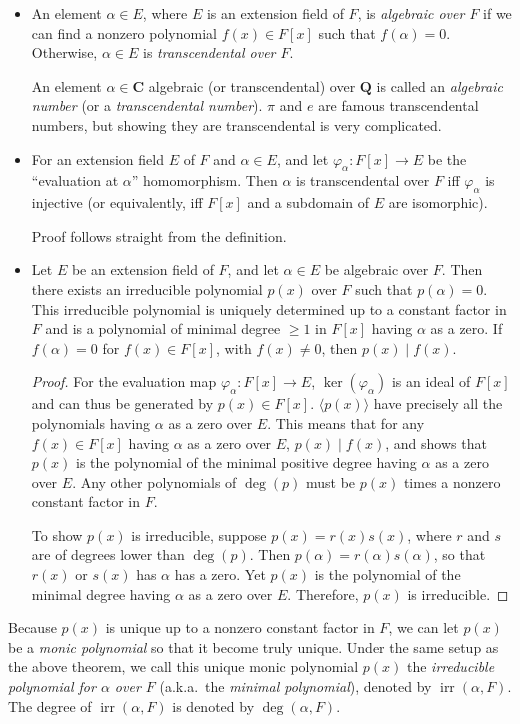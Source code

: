 \documentclass[11pt]{article}
\newcommand{\Q}{\mathbf{Q}}
\newcommand{\C}{\mathbf{C}}
\newcommand{\df}[1]{\textit{\textsf{#1}}}
\newcommand{\gen}[1]{\langle #1 \rangle}
\newcommand{\irr}{\operatorname{irr}}
\renewcommand{\phi}{\varphi}
\begin{document}
\begin{itemize}
    \item An element $\alpha \in E$, where $E$ is an extension field of $F$, is \df{algebraic over $F$} if we can find a nonzero polynomial $f(x) \in F[x]$ such that $f(\alpha) = 0$. Otherwise, $\alpha \in E$ is \df{transcendental over $F$}.
    
    An element $\alpha \in \C$ algebraic (or transcendental) over $\Q$ is called an \df{algebraic number} (or a \df{transcendental number}). $\pi$ and $e$ are famous transcendental numbers, but showing they are transcendental is very complicated.
    \item For an extension field $E$ of $F$ and $\alpha \in E$, and let $\phi_\alpha\colon F[x] \to E$ be the ``evaluation at $\alpha$'' homomorphism. Then $\alpha$ is transcendental over $F$ iff $\phi_\alpha$ is injective (or equivalently, iff $F[x]$ and a subdomain of $E$ are isomorphic).

    Proof follows straight from the definition.
    \item Let $E$ be an extension field of $F$, and let $\alpha \in E$ be algebraic over $F$. Then there exists an irreducible polynomial $p(x)$ over $F$ such that $p(\alpha) = 0$. This irreducible polynomial is uniquely determined up to a constant factor in $F$ and is a polynomial of minimal degree $\geq 1$ in $F[x]$ having $\alpha$ as a zero. If $f(\alpha) = 0$ for $f(x) \in F[x]$, with $f(x) \neq 0$, then $p(x) \mid f(x)$.
    \begin{proof}
        For the evaluation map $\phi_\alpha\colon F[x] \to E$, $\ker(\phi_\alpha)$ is an ideal of $F[x]$ and can thus be generated by $p(x) \in F[x]$. $\gen{p(x)}$ have precisely all the polynomials having $\alpha$ as a zero over $E$. This means that for any $f(x) \in F[x]$ having $\alpha$ as a zero over $E$, $p(x) \mid f(x)$, and shows that $p(x)$ is the polynomial of the minimal positive degree having $\alpha$ as a zero over $E$. Any other polynomials of $\deg(p)$ must be $p(x)$ times a nonzero constant factor in $F$.

        To show $p(x)$ is irreducible, suppose $p(x) = r(x)s(x)$, where $r$ and $s$ are of degrees lower than $\deg(p)$. Then $p(\alpha) = r(\alpha)s(\alpha)$, so that $r(x)$ or $s(x)$ has $\alpha$ has a zero. Yet $p(x)$ is the polynomial of the minimal degree having $\alpha$ as a zero over $E$. Therefore, $p(x)$ is irreducible.
    \end{proof}  
\end{itemize}
\begin{framed}
    Because $p(x)$ is unique up to a nonzero constant factor in $F$, we can let $p(x)$ be a \emph{monic polynomial} so that it become truly unique. Under the same setup as the above theorem, we call this unique monic polynomial $p(x)$ the \df{irreducible polynomial for $\alpha$ over $F$} (a.k.a.\ the \df{minimal polynomial}), denoted by $\irr(\alpha,F)$. The degree of $\irr(\alpha,F)$ is denoted by $\deg(\alpha,F)$.
\end{framed}
\end{document}
